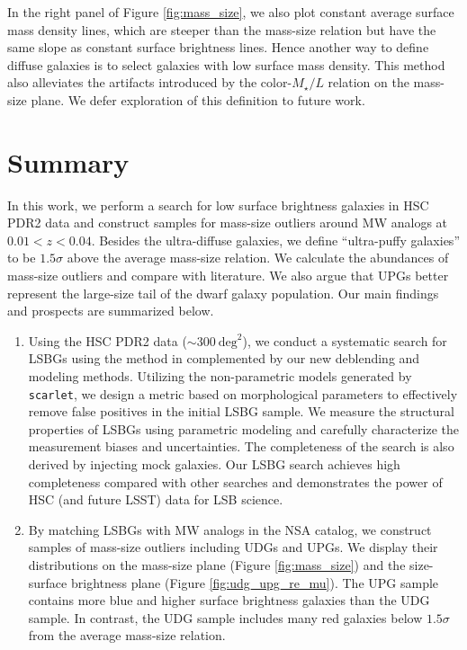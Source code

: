 \documentclass[twocolumn,astrosymb,twocolappendix,linenumbers]{aastex631}
\newcommand{\code}[1]{\texttt{#1}}
\begin{document}
\begin{CJK*}{UTF8}{gbsn}
In the right panel of Figure \ref{fig:mass_size}, we also plot constant average surface mass density lines, which are steeper than the mass-size relation but have the same slope as constant surface brightness lines. Hence another way to define diffuse galaxies is to select galaxies with low surface mass density. This method also alleviates the artifacts introduced by the color-$M_\star/L$ relation on the mass-size plane. We defer exploration of this definition to future work.  


\section{Summary}\label{sec:summary}
In this work, we perform a search for low surface brightness galaxies in HSC PDR2 data and construct samples for mass-size outliers around MW analogs at $0.01 < z < 0.04$. Besides the ultra-diffuse galaxies, we define ``ultra-puffy galaxies'' to be $1.5\sigma$ above the average mass-size relation. We calculate the abundances of mass-size outliers and compare with literature. We also argue that UPGs better represent the large-size tail of the dwarf galaxy population. Our main findings and prospects are summarized below. 

\begin{enumerate}
    \item Using the HSC PDR2 data ($\sim 300\ \mathrm{deg}^{2}$), we conduct a systematic search for LSBGs using the method in \citet{Greco2018} complemented by our new deblending and modeling methods. Utilizing the non-parametric models generated by \code{scarlet}, we design a metric based on morphological parameters to effectively remove false positives in the initial LSBG sample. We measure the structural properties of LSBGs using parametric modeling and carefully characterize the measurement biases and uncertainties. The completeness of the search is also derived by injecting mock galaxies. Our LSBG search achieves high completeness compared with other searches and demonstrates the power of HSC (and future LSST) data for LSB science. 
    
    \item By matching LSBGs with MW analogs in the NSA catalog, we construct samples of mass-size outliers including UDGs and UPGs. We display their distributions on the mass-size plane (Figure \ref{fig:mass_size}) and the size-surface brightness plane (Figure \ref{fig:udg_upg_re_mu}). The UPG sample contains more blue and higher surface brightness galaxies than the UDG sample. In contrast, the UDG sample includes many red galaxies below $1.5\sigma$ from the average mass-size relation.
    

\end{enumerate}
\end{CJK*}
\end{document}
